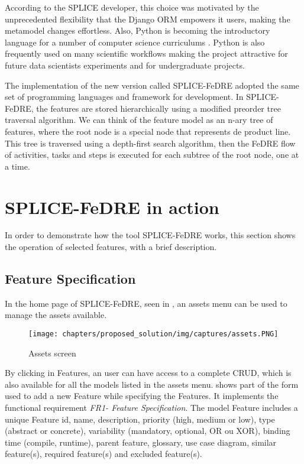 According to the \ac{SPLICE} developer, this choice was motivated by the unprecedented flexibility that 
the Django \acf{ORM} empowers it users, making the metamodel changes
effortless.
Also, Python is becoming the introductory language for a number of computer science curriculums  
\citep{Sanders2008}. Python is also frequently used on many scientific workflows
\citep{Bui2010} making the project attractive for future data scientists
experiments and for undergraduate projects.
 
The implementation of the new version called SPLICE-FeDRE adopted the same set of programming languages and 
framework for development. In SPLICE-FeDRE, the features are stored hierarchically using a modified preorder 
tree traversal algorithm. We can think of the feature model as 
an n-ary tree of features, where the root node is a special node that represents de product line. This 
tree is traversed using a depth-first search algorithm, then the \ac{FeDRE} flow of activities, tasks and 
steps is executed for each subtree of the root node, one at a time. 

\section{SPLICE-FeDRE in action}
\label{sc:operation}

In order to demonstrate how the tool SPLICE-FeDRE works, this section shows the 
operation of selected features, with a brief description.

\subsection{Feature Specification}

In the home page of SPLICE-FeDRE, seen in , an assets menu can
be used to manage the assets available.

\begin{figure}[htp]
\begin{center}
  \texttt{[image: chapters/proposed\_solution/img/captures/assets.PNG]}
  \caption[Assets screen]{Assets screen}
  \label{fg:assets}
\end{center}
\end{figure}

By clicking in Features, an user can have access to a complete \acf{CRUD}, 
which is also available for all the models listed in the assets menu.  
shows part of the form used to add a new Feature while specifying the Features. It implements the functional
requirement \textit{FR1- Feature Specification}. The model Feature includes a unique Feature id, 
name, description, priority (high, medium or low), type (abstract or concrete), variability 
(mandatory, optional, OR ou XOR), binding time (compile, runtime), parent feature, glossary, use case 
diagram, similar feature(s), required feature(s) and excluded feature(s). 

